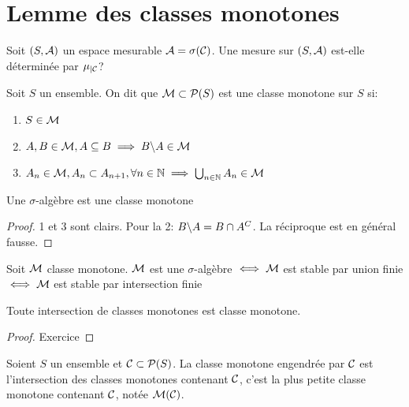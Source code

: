 \documentclass[]{report}
\begin{document}
    \section{Lemme des classes monotones}

    \begin{qs*}{}{}
        Soit $(S,\mathcal{A})$ un espace mesurable \tq $\mathcal{A}=\sigma(\mathcal{C})$. Une mesure sur $(S,\mathcal{A})$ est-elle déterminée par $\mu_{|\mathcal{C}}$?
    \end{qs*}

    \begin{df}{}{}
        Soit $S$ un ensemble. On dit que $\mathcal{M}\subset \mathcal{P}(S)$ est une classe monotone sur $S$ si:
        \begin{enumerate}
            \item $S\in\mathcal{M}$
            \item $A,B\in\mathcal{M},A\subseteq B\implies B\backslash A\in \mathcal{M}$
            \item $A_n\in\mathcal{M},A_n\subset A_{n+1},\forall n\in\mathbb{N}\implies \bigcup_{n\in\mathbb{N}}A_n\in\mathcal{M}$
        \end{enumerate}
    \end{df}

    \begin{prop}{}{}
        Une $\sigma$-algèbre est une classe monotone
    \end{prop}

    \begin{proof}{}{}
        1 et 3 sont clairs. Pour la 2: $B\backslash A=B\cap A^C$. La réciproque est en général fausse.
    \end{proof}

    \begin{prop}{}{}
        Soit $\mathcal{M}$ classe monotone. $\mathcal{M}$ est une $\sigma$-algèbre $\iff \mathcal{M}$ est stable par union finie $\iff \mathcal{M}$ est stable par intersection finie
    \end{prop}

    \begin{prop}{}{}
        Toute intersection de classes monotones est classe monotone.
    \end{prop}

    \begin{proof}{}{}
        Exercice
    \end{proof}

    \begin{df}{}{}
        Soient $S$ un ensemble et $\mathcal{C}\subset \mathcal{P}(S)$. La classe monotone engendrée par $\mathcal{C}$ est l'intersection des classes monotones contenant $\mathcal{C}$, c'est la plus petite classe monotone contenant $\mathcal{C}$, notée $\mathcal{M}(\mathcal{C})$.
    \end{df}
\end{document}

